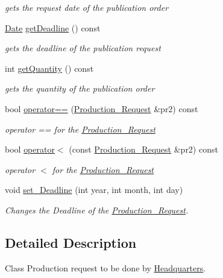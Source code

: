 \begin{DoxyCompactItemize}
\begin{DoxyCompactList}\small\item\em gets the request date of the publication order \end{DoxyCompactList}\item 
\hyperlink{class_date}{Date} \hyperlink{class_production___request_a3df39092c2aac5a34401f38a29097b3a}{get\+Deadline} () const
\begin{DoxyCompactList}\small\item\em gets the deadline of the publication request \end{DoxyCompactList}\item 
int \hyperlink{class_production___request_aac38238db2c32af73c839314c3e254a6}{get\+Quantity} () const
\begin{DoxyCompactList}\small\item\em gets the quantity of the publication order \end{DoxyCompactList}\item 
bool \hyperlink{class_production___request_a37fd21082c7c874be9587e8d3cce7174}{operator==} (\hyperlink{class_production___request}{Production\+\_\+\+Request} \&pr2) const
\begin{DoxyCompactList}\small\item\em operator == for the \hyperlink{class_production___request}{Production\+\_\+\+Request} \end{DoxyCompactList}\item 
bool \hyperlink{class_production___request_acf3db397822496809bde807696518e95}{operator$<$} (const \hyperlink{class_production___request}{Production\+\_\+\+Request} \&pr2) const
\begin{DoxyCompactList}\small\item\em operator $<$ for the \hyperlink{class_production___request}{Production\+\_\+\+Request} \end{DoxyCompactList}\item 
void \hyperlink{class_production___request_a3329479425a0e91eec8cf2f8fabc185e}{set\+\_\+\+Deadline} (int year, int month, int day)
\begin{DoxyCompactList}\small\item\em Changes the Deadline of the \hyperlink{class_production___request}{Production\+\_\+\+Request}. \end{DoxyCompactList}\end{DoxyCompactItemize}


\subsection{Detailed Description}
Class Production request to be done by \hyperlink{class_headquarters}{Headquarters}. 

